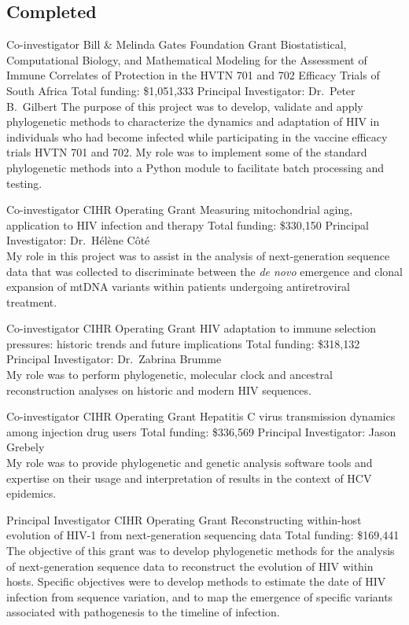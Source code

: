 \documentclass[11pt]{moderncv}
\begin{document}
\subsection {Completed}

{Co-investigator}
{Bill \& Melinda Gates Foundation Grant}
{Biostatistical, Computational Biology, and Mathematical Modeling for the Assessment of
Immune Correlates of Protection in the HVTN 701 and 702 Efficacy Trials of South Africa}
{Total funding: \$1,051,333}
{
Principal Investigator: Dr.~Peter B.~Gilbert
The purpose of this project was to develop, validate and apply phylogenetic methods to characterize the dynamics and adaptation of HIV in individuals who had become infected while participating in the vaccine efficacy trials HVTN 701 and 702.
My role was to implement some of the standard phylogenetic methods into a Python module to facilitate batch processing and testing.
}


{Co-investigator}
{CIHR Operating Grant}
{Measuring mitochondrial aging, application to HIV infection and therapy}
{Total funding: \$330,150}
{
Principal Investigator: Dr.~H\'el\`ene C\^ot\'e\\
My role in this project was to assist in the analysis of next-generation sequence data that was collected to discriminate between the \textit{de novo} emergence and clonal expansion of mtDNA variants within patients undergoing antiretroviral treatment.
}

{Co-investigator}
{CIHR Operating Grant}
{HIV adaptation to immune selection pressures: historic trends and future implications}
{Total funding: \$318,132}
{
Principal Investigator: Dr.~Zabrina Brumme\\
My role was to perform phylogenetic, molecular clock and ancestral reconstruction analyses on historic and modern HIV sequences.
}

{Co-investigator}
{CIHR Operating Grant}
{Hepatitis C virus transmission dynamics among injection drug users}
{Total funding: \$336,569}
{
Principal Investigator: Jason Grebely\\
My role was to provide phylogenetic and genetic analysis software tools and expertise on their usage and interpretation of results in the context of HCV epidemics.
}

{Principal Investigator}
{CIHR Operating Grant}
{Reconstructing within-host evolution of HIV-1 from next-generation sequencing data}
{Total funding: \$169,441}
{
The objective of this grant was to develop phylogenetic methods for the analysis of next-generation sequence data to reconstruct the evolution of HIV within hosts.
Specific objectives were to develop methods to estimate the date of HIV infection from sequence variation, and to map the emergence of specific variants associated with pathogenesis to the timeline of infection.
}
\end{document}
